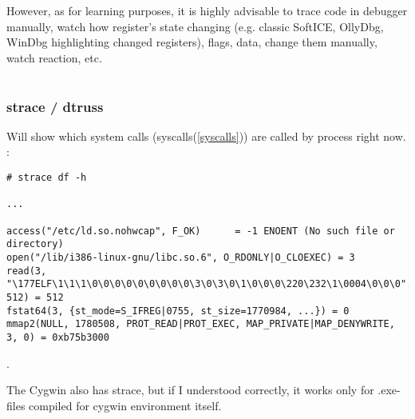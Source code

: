 {However, as for learning purposes, it is highly advisable to trace code in debugger manually, watch how register's state
changing (e.g. classic SoftICE, OllyDbg, WinDbg highlighting changed registers), flags, data, change them
manually, watch reaction, etc.}

\chapter{}

\label{strace}
\subsection{strace / dtruss}

{Will show which system calls (syscalls(\ref{syscalls})) are called by process right now}.
:

\begin{lstlisting}
# strace df -h

...

access("/etc/ld.so.nohwcap", F_OK)      = -1 ENOENT (No such file or directory)
open("/lib/i386-linux-gnu/libc.so.6", O_RDONLY|O_CLOEXEC) = 3
read(3, "\177ELF\1\1\1\0\0\0\0\0\0\0\0\0\3\0\3\0\1\0\0\0\220\232\1\0004\0\0\0"..., 512) = 512
fstat64(3, {st_mode=S_IFREG|0755, st_size=1770984, ...}) = 0
mmap2(NULL, 1780508, PROT_READ|PROT_EXEC, MAP_PRIVATE|MAP_DENYWRITE, 3, 0) = 0xb75b3000
\end{lstlisting}

.

{The Cygwin also has strace, but if I understood correctly, it works only for .exe-files
compiled for cygwin environment itself}.

\chapter{}

